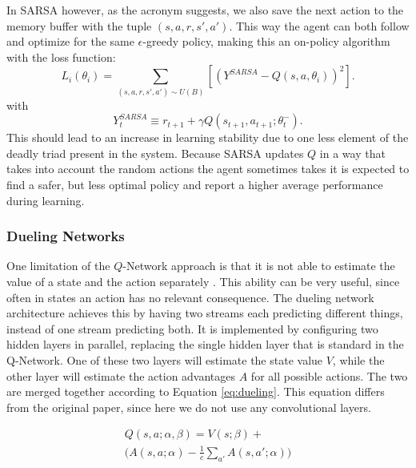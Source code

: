 In SARSA however, as the acronym suggests, we also save the next action to the memory buffer with the tuple $(s,a,r,s',a')$. This way the agent can both follow and optimize for the same $\epsilon$-greedy policy, making this an on-policy algorithm with the loss function:
\begin{equation}
    L_i(\theta_i)= \sum_{(s,a,r,s',a') \sim U(B)}[(Y^{SARSA}-Q(s,a,\theta_i))^2].
\end{equation}
with
\begin{equation}\label{eq:target_sarsa}
    Y^{SARSA}_t \equiv r_{t+1} + \gamma Q(s_{t+1}, a_{t+1}; \theta_t^-).
\end{equation}
This should lead to an increase in learning stability due to one less element of the deadly triad present in the system. Because SARSA updates $Q$ in a way that takes into account the random actions the agent sometimes takes it is expected to find a safer, but less optimal policy \citep{sutton_barto_2018} and report a higher average performance during learning.


\subsubsection{Dueling Networks}\label{sec:dueling}
One limitation of the $Q$-Network approach is that it is not able to estimate the value of a state and the action separately \citep{wang2015dueling}. This ability can be very useful, since often in states an action has no relevant consequence. The dueling network architecture achieves this by having two streams each predicting different things, instead of one stream predicting both. It is implemented by configuring two hidden layers in parallel, replacing the single hidden layer that is standard in the Q-Network. One of these two layers will estimate the state value $V$, while the other layer will estimate the action advantages $A$ for all possible actions. The two are merged together according to Equation \eqref{eq:dueling}. This equation differs from the original paper, since here we do not use any convolutional layers.

\begin{equation} \label{eq:dueling}
  \begin{array}{l}
    Q(s,a; \alpha, \beta) = V(s; \beta) + \\ 
    \Big(A(s, a; \alpha) - \frac{1}{c} \sum\limits_{a'} A(s,a'; \alpha)\Big)
  \end{array}
\end{equation}

